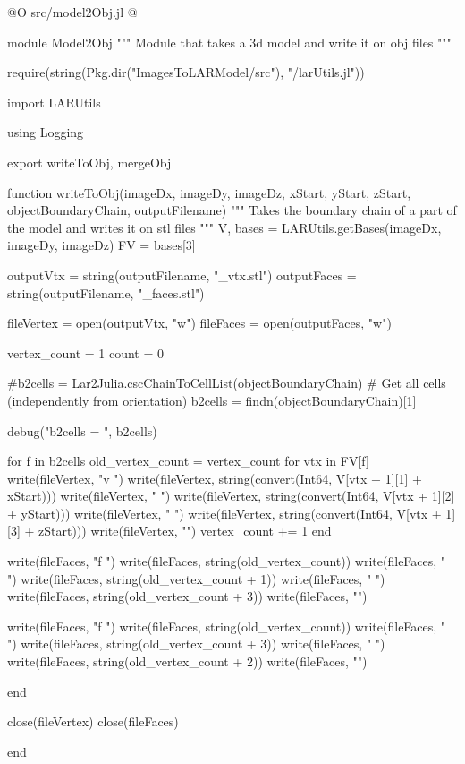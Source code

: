 \documentclass[11pt,oneside]{article}	%
\begin{document}
@O src/model2Obj.jl
@{module Model2Obj
"""
Module that takes a 3d model and write it on
obj files
"""

require(string(Pkg.dir("ImagesToLARModel/src"), "/larUtils.jl"))

import LARUtils

using Logging

export writeToObj, mergeObj

function writeToObj(imageDx, imageDy, imageDz,
                    xStart, yStart, zStart,
                    objectBoundaryChain, outputFilename)
  """
  Takes the boundary chain of a part of the model
  and writes it on stl files
  """
  V, bases = LARUtils.getBases(imageDx, imageDy, imageDz)
  FV = bases[3]

  outputVtx = string(outputFilename, "_vtx.stl")
  outputFaces = string(outputFilename, "_faces.stl")

  fileVertex = open(outputVtx, "w")
  fileFaces = open(outputFaces, "w")

  vertex_count = 1
  count = 0

  #b2cells = Lar2Julia.cscChainToCellList(objectBoundaryChain)
  # Get all cells (independently from orientation)
  b2cells = findn(objectBoundaryChain)[1]

  debug("b2cells = ", b2cells)

  for f in b2cells
    old_vertex_count = vertex_count
    for vtx in FV[f]
      write(fileVertex, "v ")
      write(fileVertex, string(convert(Int64, V[vtx + 1][1] + xStart)))
      write(fileVertex, " ")
      write(fileVertex, string(convert(Int64, V[vtx + 1][2] + yStart)))
      write(fileVertex, " ")
      write(fileVertex, string(convert(Int64, V[vtx + 1][3] + zStart)))
      write(fileVertex, "\n")
      vertex_count += 1
    end

    write(fileFaces, "f ")
    write(fileFaces, string(old_vertex_count))
    write(fileFaces, " ")
    write(fileFaces, string(old_vertex_count + 1))
    write(fileFaces, " ")
    write(fileFaces, string(old_vertex_count + 3))
    write(fileFaces, "\n")

    write(fileFaces, "f ")
    write(fileFaces, string(old_vertex_count))
    write(fileFaces, " ")
    write(fileFaces, string(old_vertex_count + 3))
    write(fileFaces, " ")
    write(fileFaces, string(old_vertex_count + 2))
    write(fileFaces, "\n")

  end

  close(fileVertex)
  close(fileFaces)

end

}
\end{document}
